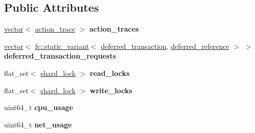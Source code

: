 \subsection*{Public Attributes}
\begin{DoxyCompactItemize}
\item 
\mbox{\label{structaacio_1_1chain_1_1transaction__trace_abc79186f0c1ec990a192210c9cb4b0bf}} 
\mbox{\hyperlink{classstd_1_1vector}{vector}}$<$ \mbox{\hyperlink{structaacio_1_1chain_1_1action__trace}{action\+\_\+trace}} $>$ {\bfseries action\+\_\+traces}
\item 
\mbox{\label{structaacio_1_1chain_1_1transaction__trace_a638deb43df0b29c936ebb0e8158e2cc0}} 
\mbox{\hyperlink{classstd_1_1vector}{vector}}$<$ \mbox{\hyperlink{classfc_1_1static__variant}{fc\+::static\+\_\+variant}}$<$ \mbox{\hyperlink{structaacio_1_1chain_1_1deferred__transaction}{deferred\+\_\+transaction}}, \mbox{\hyperlink{structaacio_1_1chain_1_1deferred__reference}{deferred\+\_\+reference}} $>$ $>$ {\bfseries deferred\+\_\+transaction\+\_\+requests}
\item 
\mbox{\label{structaacio_1_1chain_1_1transaction__trace_a132c69b9ee46d3ebdee1c604861f1ac6}} 
flat\+\_\+set$<$ \mbox{\hyperlink{structaacio_1_1chain_1_1shard__lock}{shard\+\_\+lock}} $>$ {\bfseries read\+\_\+locks}
\item 
\mbox{\label{structaacio_1_1chain_1_1transaction__trace_ab22e3ae4d08d7255b23bfa6f8202a1bd}} 
flat\+\_\+set$<$ \mbox{\hyperlink{structaacio_1_1chain_1_1shard__lock}{shard\+\_\+lock}} $>$ {\bfseries write\+\_\+locks}
\item 
\mbox{\label{structaacio_1_1chain_1_1transaction__trace_a9a5884e1434cd8f6ede41b4eb01f8c08}} 
uint64\+\_\+t {\bfseries cpu\+\_\+usage}
\item 
\mbox{\label{structaacio_1_1chain_1_1transaction__trace_ae48698f000b5a34dac94e9e3b8860a5f}} 
uint64\+\_\+t {\bfseries net\+\_\+usage}
\item 
\mbox{\label{structaacio_1_1chain_1_1transaction__trace_a32bb1ecb066e1551b0ea0872a5512b63}} 

\end{DoxyCompactItemize}
